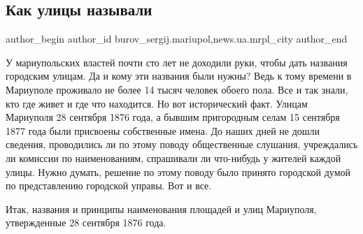  
 
 
 
 
 
\subsection{Как улицы называли}
\label{sec:24_12_2016.stz.news.ua.mrpl_city.1.kak_ulicy_nazyvali}
 
\ifcmt
 author_begin
   author_id burov_sergij.mariupol,news.ua.mrpl_city
 author_end
\fi


У мариупольских властей почти сто лет не доходили руки, чтобы дать названия
городским улицам. Да и кому эти названия были нужны? Ведь к тому времени в
Мариуполе проживало не более 14 тысяч человек обоего пола. Все и так знали, кто
где живет и где что находится. Но вот исторический факт. Улицам Мариуполя 28
сентября 1876 года, а бывшим пригородным селам 15 сентября 1877 года были
присвоены собственные имена. До наших дней не дошли сведения, проводились ли по
этому поводу общественные слушания, учреждались ли комиссии по наименованиям,
спрашивали ли что-нибудь у жителей каждой улицы. Нужно думать, решение по этому
поводу было принято  городской думой по представлению городской управы. Вот и
все.


Итак, названия и принципы наименования площадей и улиц Мариуполя, утвержденные
28 сентября 1876 года.  

